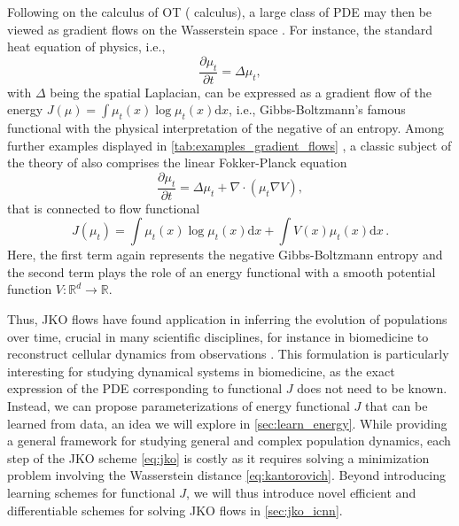 Following \citet{otto2001geometry} on the calculus of \acrlong{OT} (\citeauthor{otto2001geometry} calculus), a large class of \acrlong{PDE} may then be viewed as gradient flows on the Wasserstein space \citep{jordan1998variational}.
For instance, the standard heat equation of physics, i.e.,
\begin{equation*}
	\frac{\partial \mu_t}{\partial t} = \Delta \mu_t,
\end{equation*}
with $\Delta$ being the spatial Laplacian, can be expressed as a gradient flow of the energy $J(\mu) = \int \mu_t(x) \log \mu_t(x) \mathrm{d} x$, i.e., Gibbs-Boltzmann's famous functional with the physical interpretation of the negative of an entropy.
Among further examples displayed in \cref{tab:examples_gradient_flows} \citep{alvarez2021optimizing, villani2021topics}, a classic subject of the theory of  also comprises the linear Fokker-Planck equation
\begin{equation}
	\label{eq:linear_fokker_planck}
	\frac{\partial \mu_t}{\partial t} = \Delta \mu_t+\nabla \cdot(\mu_t \nabla V),
\end{equation}
that is connected to flow functional
\begin{equation*}
	J(\mu_t) = \int \mu_t(x) \log \mu_t(x) \mathrm{d} x+\int V(x) \mu_t(x) \mathrm{d}x\,.
\end{equation*}
Here, the first term again represents the negative Gibbs-Boltzmann entropy and the second term plays the role of an energy functional with a smooth potential function $V: \mathbb{R}^d \rightarrow \mathbb{R}$.


Thus, \acrshort{JKO} flows have found application in inferring the evolution of populations over time, crucial in many scientific disciplines, for instance in biomedicine to reconstruct cellular dynamics from observations \citep{bunne2022proximal, alvarez2021optimizing, mokrov2021large, benamou2016augmented}.
This formulation is particularly interesting for studying dynamical systems in biomedicine, as the exact expression of the \acrshort{PDE} corresponding to functional $J$ does not need to be known.
Instead, we can propose parameterizations of energy functional $J$ that can be learned from data, an idea we will explore in \cref{sec:learn_energy}.
While providing a general framework for studying general and complex population dynamics, each step of the \acrshort{JKO} scheme \eqref{eq:jko} is costly as it requires solving a minimization problem involving the Wasserstein distance \eqref{eq:kantorovich}. Beyond introducing learning schemes for functional $J$, we will thus introduce novel efficient and differentiable schemes for solving \acrshort{JKO} flows in \cref{sec:jko_icnn}.



